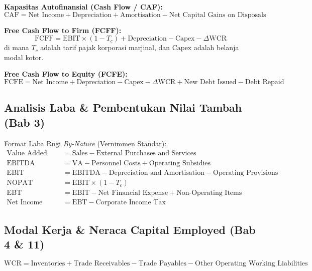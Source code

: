\documentclass[10pt,a4paper]{article}
\begin{document}
\textbf{Kapasitas Autofinansial (Cash Flow / CAF):}
\begin{equation}
\text{CAF} = \text{Net Income} + \text{Depreciation} + \text{Amortisation} - \text{Net Capital Gains on Disposals}
\end{equation}

\textbf{Free Cash Flow to Firm (FCFF):}
\begin{equation}
\text{FCFF} = \text{EBIT} \times (1 - T_c) + \text{Depreciation} - \text{Capex} - \Delta\text{WCR}
\end{equation}
di mana $T_c$ adalah tarif pajak korporasi marjinal, dan $\text{Capex}$ adalah belanja modal kotor.

\textbf{Free Cash Flow to Equity (FCFE):}
\begin{equation}
\text{FCFE} = \text{Net Income} + \text{Depreciation} - \text{Capex} - \Delta\text{WCR} + \text{New Debt Issued} - \text{Debt Repaid}
\end{equation}

\subsection{Analisis Laba \& Pembentukan Nilai Tambah (Bab 3)}

Format Laba Rugi \textit{By-Nature} (Vernimmen Standar):
\begin{align}
\text{Value Added (VA)} &= \text{Sales} - \text{External Purchases and Services} \\
\text{EBITDA} &= \text{VA} - \text{Personnel Costs} + \text{Operating Subsidies} \\
\text{EBIT} &= \text{EBITDA} - \text{Depreciation and Amortisation} - \text{Operating Provisions} \\
\text{NOPAT} &= \text{EBIT} \times (1 - T_c) \\
\text{EBT} &= \text{EBIT} - \text{Net Financial Expense} + \text{Non-Operating Items} \\
\text{Net Income} &= \text{EBT} - \text{Corporate Income Tax}
\end{align}

\subsection{Modal Kerja \& Neraca Capital Employed (Bab 4 \& 11)}

\begin{equation}
\text{WCR} = \text{Inventories} + \text{Trade Receivables} - \text{Trade Payables} - \text{Other Operating Working Liabilities}
\end{equation}
\end{document}
